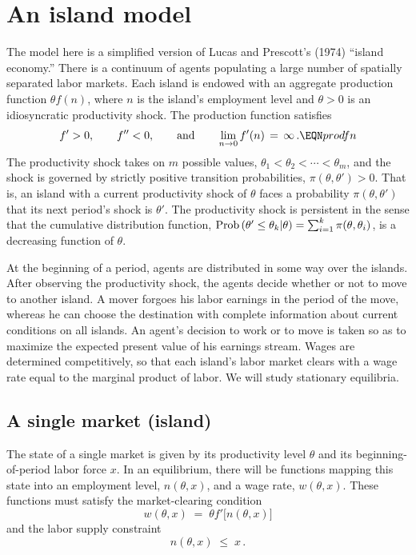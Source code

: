 \section{An island model}\label{sec:LucasPrescott}%
The model here is a simplified version of Lucas and
Prescott's (1974) ``island economy.''
There is a continuum of agents populating a large number of spatially separated
labor markets.  Each island is endowed with an aggregate production function
$\theta f(n)$, where $n$ is the island's employment level and $\theta>0$ is an
idiosyncratic productivity shock. The production function
satisfies
$$f'>0, \qquad f''<0, \qquad {\rm and} \qquad
               \lim_{n\to0} f'(n) \,=\, \infty\,.       \EQN prodfn
$$
The productivity shock takes on $m$ possible values,
$\theta_1 < \theta_2 < \cdots < \theta_m$, and the
shock is governed by strictly positive transition probabilities,
$\pi(\theta, \theta') > 0$. That is, an island with a current
productivity shock of $\theta$ faces a probability
$\pi(\theta, \theta')$ that its next period's shock is $\theta'$.
The productivity shock is persistent in the sense that the
cumulative distribution function,
${\rm Prob}\left(\theta' \leq \theta_k \vert \theta \right) =
\sum_{i=1}^k \pi(\theta, \theta_i)$, is a decreasing
function of $\theta$.

\newpage

At the beginning of a period, agents are distributed in some
way over the islands. After observing the productivity shock, the
agents decide whether or not to move to another island. A mover
forgoes his labor earnings in the period of the move, whereas he
can choose the destination with complete information about
current conditions on all islands. An agent's decision to work or to move
is taken so as to maximize the expected
present value of his earnings stream. Wages are determined
competitively, so that each island's labor market clears with
a wage rate equal to the marginal product of labor.
We will study stationary equilibria.


\subsection{A single market (island)}

The state of a single market is given by its productivity level
$\theta$ and its beginning-of-period labor force $x$. In an
equilibrium, there will be functions mapping this state into
an employment level, $n(\theta, x)$, and a wage rate,
$w(\theta, x)$. These functions must satisfy the market-clearing
condition
$$w(\theta, x) \;=\; \theta f'\bigl[ n(\theta, x) \bigr]   $$
and the labor supply constraint
$$n(\theta, x) \;\leq\; x \,.
$$

